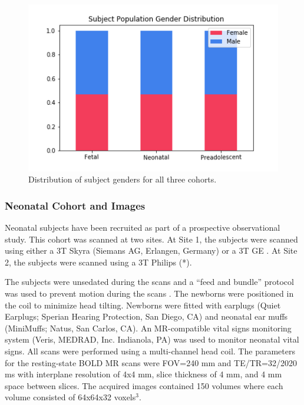 \begin{figure}
\centering
\includegraphics[width=.75\textwidth]{5/demo_clinical_subj_gender.png}
\caption{Distribution of subject genders for all three cohorts.}
\label{ch5:clinical:gender}
\end{figure}

\subsubsection{Neonatal Cohort and Images}

Neonatal subjects have been recruited as part of a prospective observational study. This cohort was scanned at two sites. At Site 1, the subjects were scanned using either a 3T Skyra (Siemans AG, Erlangen, Germany) or a 3T GE . At Site 2, the subjects were scanned using a 3T Philips (*).

The subjects were unsedated during the scans and a ``feed and bundle'' protocol was used to prevent motion during the scans \cite{Windram2011}. The newborns were positioned in the coil to minimize head tilting. Newborns were fitted with earplugs (Quiet Earplugs; Sperian Hearing Protection, San Diego, CA) and neonatal ear muffs (MiniMuffs; Natus, San Carlos, CA). An MR-compatible vital signs monitoring system (Veris, MEDRAD, Inc. Indianola, PA) was used to monitor neonatal vital signs. All scans were performed using a multi-channel head coil. The parameters for the resting-state BOLD MR scans were FOV=240 mm and TE/TR=32/2020 ms with interplane resolution of 4x4 mm, slice thickness of 4 mm, and 4 mm space between slices. The acquired images contained 150 volumes where each volume consisted of 64x64x32 voxels$^3$.

